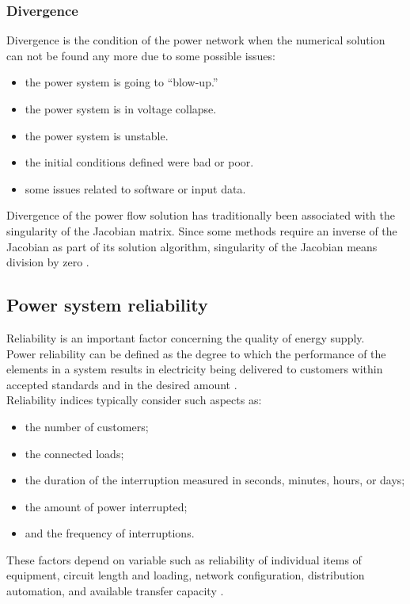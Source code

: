 \subsubsection{Divergence}
Divergence is the condition of the power network when the numerical solution can not be found any more due to some possible issues:

\begin{itemize}
    \item the power system is going to “blow-up.”
    \item the power system is in voltage collapse.
    \item the power system is unstable.
    \item the initial conditions defined were bad or poor.
    \item some issues related to software or input data.
\end{itemize}

Divergence of the power flow solution has traditionally been associated with the singularity of the Jacobian matrix. Since some methods require an inverse of the Jacobian as part of its solution algorithm, singularity of the Jacobian means division by zero \cite{eps}.


\subsection{Power system reliability}
\label{sec:psr}
Reliability is an important factor concerning the quality of energy supply. \\
Power reliability can be defined as the degree to which the performance of the elements in a system results in electricity being delivered to customers within accepted standards and in the desired amount \cite{MPRPQ}. \\
Reliability indices typically consider such aspects as:
\begin{itemize}
 \item the number of customers;
 \item the connected loads;
 \item the duration of the interruption measured in seconds, minutes, hours, or days;
 \item the amount of power interrupted;  
 \item and the frequency of interruptions.
\end{itemize}

These factors depend on variable such as reliability of individual items of equipment, circuit length and loading, network configuration, distribution automation, and available transfer capacity \cite{EDNdesign}. \\

